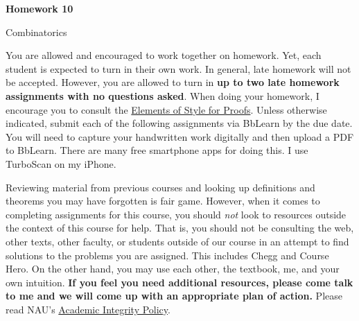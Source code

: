 \documentclass[11pt]{article}%
\theoremstyle{definition}
\newcommand{\blankline}{\pagebreak[2]\vspace{.5\baselineskip}}
\begin{document}
\begin{center}
{\Large\bf Homework 10}

\smallskip

Combinatorics
\end{center}

\thispagestyle{fancy}

You are allowed and encouraged to work together on homework. Yet, each student is expected to turn in their own work. In general, late homework will not be accepted. However, you are allowed to turn in \textbf{up to two late homework assignments with no questions asked}. When doing your homework, I encourage you to consult the \href{http://danaernst.com/teaching/ElementsOfStyle.pdf}{Elements of Style for Proofs}. Unless otherwise indicated, submit each of the following assignments via BbLearn by the due date. You will need to capture your handwritten work digitally and then upload a PDF to BbLearn. There are many free smartphone apps for doing this. I use TurboScan on my iPhone.

\blankline

Reviewing material from previous courses and looking up definitions and theorems you may have forgotten is fair game. However, when it comes to completing assignments for this course, you should \emph{not} look to resources outside the context of this course for help.  That is, you should not be consulting the web, other texts, other faculty, or students outside of our course in an attempt to find solutions to the problems you are assigned.  This includes Chegg and Course Hero. On the other hand, you may use each other, the textbook, me, and your own intuition. \textbf{If you feel you need additional resources, please come talk to me and we will come up with an appropriate plan of action.} Please read NAU's \href{https://www5.nau.edu/policies/Client/Details/828?whoIsLooking=Students&pertainsTo=All&sortDirection=Ascending&page=1}{Academic Integrity Policy}.

\blankline
\end{document}
